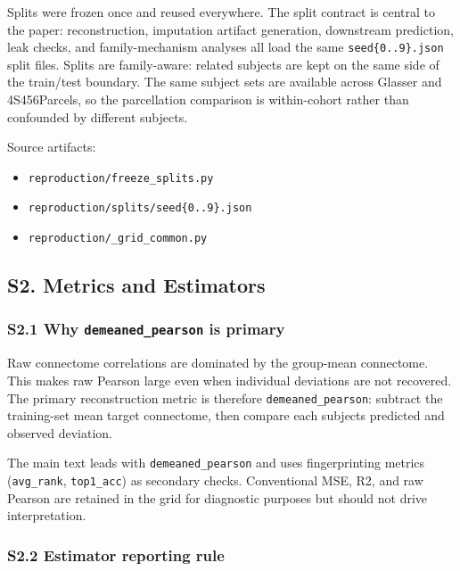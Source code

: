Splits were frozen once and reused everywhere. The split contract is central to the paper: reconstruction, imputation artifact generation, downstream prediction, leak checks, and family-mechanism analyses all load the same \texttt{seed\{0..9\}.json} split files. Splits are family-aware: related subjects are kept on the same side of the train/test boundary. The same subject sets are available across Glasser and 4S456Parcels, so the parcellation comparison is within-cohort rather than confounded by different subjects.

Source artifacts:

\begin{itemize}
\tightlist
\item
  \texttt{reproduction/freeze\_splits.py}
\item
  \texttt{reproduction/splits/seed\{0..9\}.json}
\item
  \texttt{reproduction/\_grid\_common.py}
\end{itemize}

\subsection{S2. Metrics and Estimators}\label{s2-metrics-and-estimators}

\subsubsection{\texorpdfstring{S2.1 Why \texttt{demeaned\_pearson} is primary}{S2.1 Why demeaned\_pearson is primary}}\label{s21-why-demeaned_pearson-is-primary}

Raw connectome correlations are dominated by the group-mean connectome. This makes raw Pearson large even when individual deviations are not recovered. The primary reconstruction metric is therefore \texttt{demeaned\_pearson}: subtract the training-set mean target connectome, then compare each subject\textquotesingle s predicted and observed deviation.

The main text leads with \texttt{demeaned\_pearson} and uses fingerprinting metrics (\texttt{avg\_rank}, \texttt{top1\_acc}) as secondary checks. Conventional MSE, R2, and raw Pearson are retained in the grid for diagnostic purposes but should not drive interpretation.

\subsubsection{S2.2 Estimator reporting rule}\label{s22-estimator-reporting-rule}

